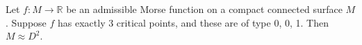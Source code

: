 Let $f: M \to \mathbb{R}$ be an admissible Morse function on a compact connected surface $M$. Suppose $f$ has exactly 3 critical points, and these are of type 0, 0, 1. Then $M \approx D^2$.

